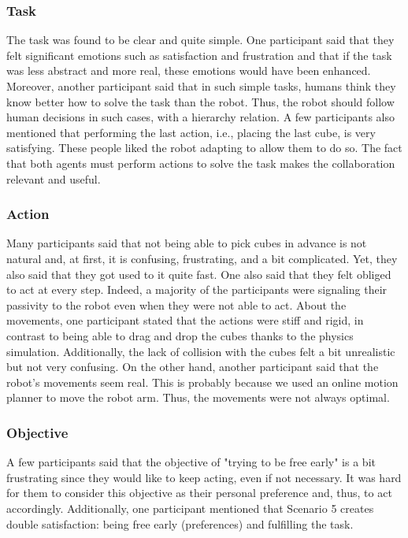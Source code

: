 \subsubsection{Task}
The task was found to be clear and quite simple. One participant said that they felt significant emotions such as satisfaction and frustration and that if the task was less abstract and more real, these emotions would have been enhanced. Moreover, another participant said that in such simple tasks, humans think they know better how to solve the task than the robot. Thus, the robot should follow human decisions in such cases, with a hierarchy relation. A few participants also mentioned that performing the last action, i.e., placing the last cube, is very satisfying. These people liked the robot adapting to allow them to do so. 
The fact that both agents must perform actions to solve the task makes the collaboration relevant and useful. 

\subsubsection{Action}
Many participants said that not being able to pick cubes in advance is not natural and, at first, it is confusing, frustrating, and a bit complicated. Yet, they also said that they got used to it quite fast. One also said that they felt obliged to act at every step. Indeed, a majority of the participants were signaling their passivity to the robot even when they were not able to act. 
About the movements, one participant stated that the actions were stiff and rigid, in contrast to being able to drag and drop the cubes thanks to the physics simulation. Additionally, the lack of collision with the cubes felt a bit unrealistic but not very confusing.
On the other hand, another participant said that the robot's movements seem real. This is probably because we used an online motion planner to move the robot arm. Thus, the movements were not always optimal.

\subsubsection{Objective}
A few participants said that the objective of "trying to be free early" is a bit frustrating since they would like to keep acting, even if not necessary. It was hard for them to consider this objective as their personal preference and, thus, to act accordingly. 
Additionally, one participant mentioned that Scenario 5 creates double satisfaction: being free early (preferences) and fulfilling the task.

